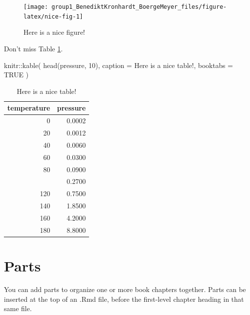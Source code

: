 \documentclass[
  11pt,
  a4paper,
  twoside]{scrbook}
\newenvironment{Shaded}{\begin{snugshade}}{\end{snugshade}}
\newcommand{\AttributeTok}[1]{\textcolor[rgb]{0.77,0.63,0.00}{#1}}
\newcommand{\ConstantTok}[1]{\textcolor[rgb]{0.00,0.00,0.00}{#1}}
\newcommand{\DecValTok}[1]{\textcolor[rgb]{0.00,0.00,0.81}{#1}}
\newcommand{\FunctionTok}[1]{\textcolor[rgb]{0.00,0.00,0.00}{#1}}
\newcommand{\NormalTok}[1]{#1}
\newcommand{\SpecialCharTok}[1]{\textcolor[rgb]{0.00,0.00,0.00}{#1}}
\newcommand{\StringTok}[1]{\textcolor[rgb]{0.31,0.60,0.02}{#1}}
\begin{document}
\linespread{1}

\begin{figure}

{\centering \texttt{[image: group1\_BenediktKronhardt\_BoergeMeyer\_files/figure-latex/nice-fig-1]} 

}

\caption{Here is a nice figure!}\label{fig:nice-fig}
\end{figure}

Don't miss Table \ref{tab:nice-tab}.

\linespread{1}

\begin{Shaded}
\begin{Highlighting}[]
\NormalTok{knitr}\SpecialCharTok{::}\FunctionTok{kable}\NormalTok{(}
  \FunctionTok{head}\NormalTok{(pressure, }\DecValTok{10}\NormalTok{), }\AttributeTok{caption =} \StringTok{\textquotesingle{}Here is a nice table!\textquotesingle{}}\NormalTok{,}
  \AttributeTok{booktabs =} \ConstantTok{TRUE}
\NormalTok{)}
\end{Highlighting}
\end{Shaded}

\linespread{1}

\begin{table}

\caption{\label{tab:nice-tab}Here is a nice table!}
\centering
\begin{tabular}[t]{rr}
\toprule
temperature & pressure\\
\midrule
0 & 0.0002\\
20 & 0.0012\\
40 & 0.0060\\
60 & 0.0300\\
80 & 0.0900\\
\addlinespace
100 & 0.2700\\
120 & 0.7500\\
140 & 1.8500\\
160 & 4.2000\\
180 & 8.8000\\
\bottomrule
\end{tabular}
\end{table}

\hypertarget{parts}{%
\section{Parts}\label{parts}}

You can add parts to organize one or more book chapters together. Parts can be inserted at the top of an .Rmd file, before the first-level chapter heading in that same file.
\end{document}

